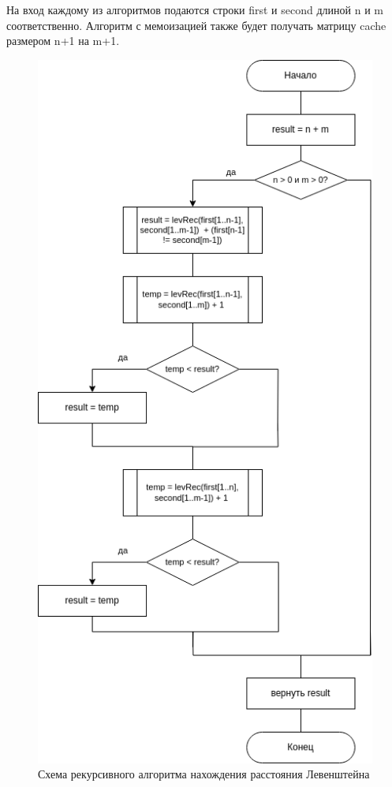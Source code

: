 На вход каждому из алгоритмов подаются строки first и second длиной n и m соответственно. Алгоритм с мемоизацией также будет получать матрицу cache размером n+1 на m+1.

\begin{figure}[h!]
	\centering
	\includegraphics[height=0.7\textheight]{tex_parts/scheme1.png}
	\caption{\label{fig:levRec}Схема рекурсивного алгоритма нахождения расстояния Левенштейна}
\end{figure}

